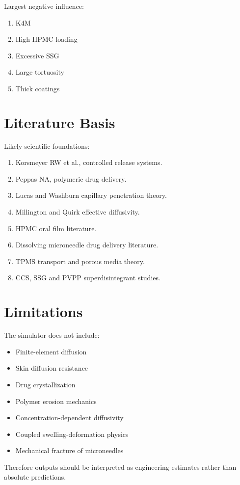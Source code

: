 \documentclass[11pt]{article}
\begin{document}
Largest negative influence:

\begin{enumerate}
\item K4M
\item High HPMC loading
\item Excessive SSG
\item Large tortuosity
\item Thick coatings
\end{enumerate}

\section{Literature Basis}

Likely scientific foundations:

\begin{enumerate}
\item Korsmeyer RW et al., controlled release systems.
\item Peppas NA, polymeric drug delivery.
\item Lucas and Washburn capillary penetration theory.
\item Millington and Quirk effective diffusivity.
\item HPMC oral film literature.
\item Dissolving microneedle drug delivery literature.
\item TPMS transport and porous media theory.
\item CCS, SSG and PVPP superdisintegrant studies.
\end{enumerate}

\section{Limitations}

The simulator does not include:

\begin{itemize}
\item Finite-element diffusion
\item Skin diffusion resistance
\item Drug crystallization
\item Polymer erosion mechanics
\item Concentration-dependent diffusivity
\item Coupled swelling-deformation physics
\item Mechanical fracture of microneedles
\end{itemize}

Therefore outputs should be interpreted as engineering estimates rather than absolute predictions.
\end{document}
